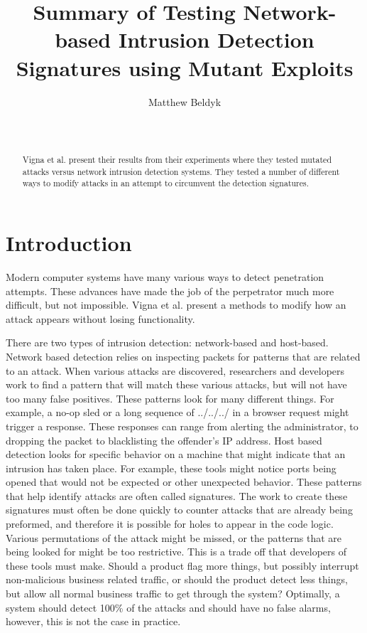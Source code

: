\documentclass{reading_glasses}
\begin{document}
\title{Summary of Testing Network-based Intrusion Detection Signatures using Mutant Exploits}

%
\author{
    \alignauthor
    Matthew Beldyk\\
    \\
    \\
}
\maketitle
\begin{abstract}
Vigna et al. present their results from their experiments where they tested mutated attacks versus network intrusion detection systems.   They tested a number of different ways to modify attacks in an attempt to circumvent the detection signatures.
\end{abstract}

\section{Introduction}

Modern computer systems have many various ways to detect penetration attempts.  These advances have made the job of the perpetrator much more difficult, but not impossible. Vigna et al. present a methods to modify how an attack appears without losing functionality.  \cite{vigna2004testing}

There are two types of intrusion detection: network-based and host-based.  Network based detection relies on inspecting packets for patterns that are related to an attack.  When various attacks are discovered, researchers and developers work to find a pattern that will match these various attacks, but will not have too many false positives.  These patterns look for many different things.  For example, a no-op sled or a long sequence of ../../../ in a browser request might trigger a response.  These responses can range from alerting the administrator, to dropping the packet to blacklisting the offender's IP address.  Host based detection looks for specific behavior on a machine that might indicate that an intrusion has taken place.  For example, these tools might notice ports being opened that would not be expected or other unexpected behavior. These patterns that help identify attacks are often called signatures.  The work to create these signatures must often be done quickly to counter attacks that are already being preformed, and therefore it is possible for holes to appear in the code logic.  Various permutations of the attack might be missed, or the patterns that are being looked for might be too restrictive.   This is a trade off that developers of these tools must make.  Should a product flag more things, but possibly interrupt non-malicious business related traffic, or should the product detect less things, but allow all normal business traffic to get through the system?  Optimally, a system should detect 100\% of the attacks and should have no false alarms, however, this is not the case in practice. \cite{vigna2004testing}
\end{document}

